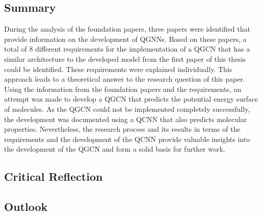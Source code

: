 \subsection{Summary}
During the analysis of the foundation papers, three papers were identified that provide information on the development of QGNNs. Based on these papers, a total of 8 different requirements for the implementation of a QGCN that has a similar architecture to the developed model from the first paper of this thesis could be identified. These requirements were explained individually. This approach leads to a theoretical answer to the research question of this paper. Using the information from the foundation papers and the requirements, an attempt was made to develop a QGCN that predicts the potential energy surface of molecules. As the QGCN could not be implemented completely successfully, the development was documented using a QCNN that also predicts molecular properties. Nevertheless, the research process and its results in terms of the requirements and the development of the QCNN provide valuable insights into the development of the QGCN and form a solid basis for further work. 

\subsection{Critical Reflection}

\subsection{Outlook}

